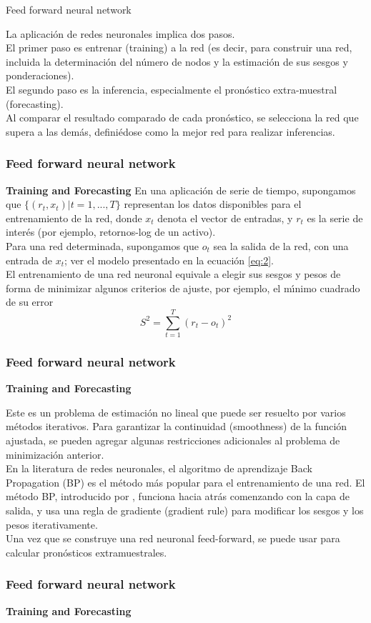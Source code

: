 \documentclass[spanish,xcolor=table]{beamer}
\begin{document}
\begin{section}{Feed forward neural network}
\begin{frame}
La aplicaci\'on de redes neuronales implica dos pasos. \\
El primer paso es entrenar (training) a la red (es decir, para construir una red, incluida la determinaci\'on del n\'umero de nodos y la estimaci\'on de sus sesgos y ponderaciones). \\
El segundo paso es la inferencia, especialmente el pron\'ostico extra-muestral (forecasting).\\
Al comparar el resultado comparado de cada pron\'ostico, se selecciona la red que supera a las dem\'as, defini\'edose como la mejor red para realizar inferencias. 
\end{frame}
\begin{frame}
\frametitle{Feed forward neural network}
\textbf{Training and Forecasting}
En una aplicaci\'on de serie de tiempo, supongamos que $\{(r_t, x_t) | t = 1, ..., T\}$ representan los datos disponibles para el entrenamiento de la red, donde $x_t$ denota el vector de entradas, y $r_t$ es la serie de inter\'es (por ejemplo, retornos-log de un activo). \\
Para una red determinada, supongamos que $o_t$ sea la salida de la red, con una entrada de $x_t$; ver el modelo presentado en la ecuaci\'on \ref{eq:2}. \\
El entrenamiento de una red neuronal equivale a elegir sus sesgos y pesos de forma de minimizar algunos criterios de ajuste, por ejemplo, el m\'{\i}nimo cuadrado de su error\\
\begin{equation*} 
S^2 =  \sum_{t=1}^ {T}  (r_t - o_t)^2 
\end{equation*}
\end{frame}
\begin{frame}
\frametitle{Feed forward neural network}
\textbf{Training and Forecasting}

Este es un problema de estimaci\'on no lineal que puede ser resuelto por varios m\'etodos iterativos. Para garantizar la continuidad (smoothness) de la funci\'on ajustada, se pueden agregar algunas restricciones adicionales al problema de minimizaci\'on anterior. \\
En la literatura de redes neuronales, el algoritmo de aprendizaje Back Propagation (BP) es el m\'etodo m\'as popular para el entrenamiento de una red. El m\'etodo BP, introducido por \cite{bryson1969applied}, funciona hacia atr\'as comenzando con la capa de salida, y usa una regla de gradiente (gradient rule) para modificar los sesgos y los pesos iterativamente.\\
 Una vez que se construye una red neuronal feed-forward, se puede usar para calcular pron\'osticos extramuestrales.
\end{frame}
\begin{frame}
\frametitle{Feed forward neural network}
\textbf{Training and Forecasting}


\end{frame}
\end{section}
\end{document}
